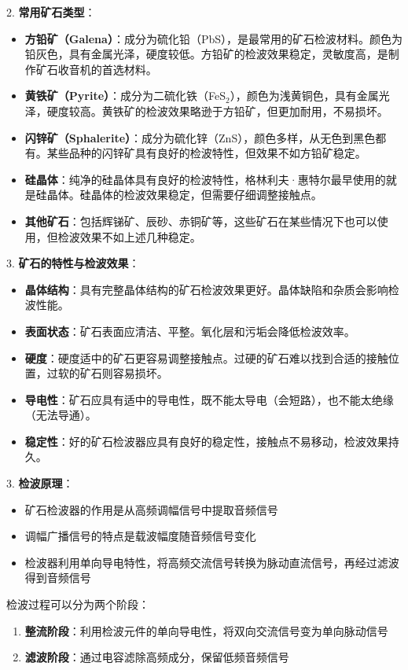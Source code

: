 \documentclass[12pt,UTF8]{ctexbook}
\begin{document}
2. \textbf{常用矿石类型}：
   \begin{itemize}[leftmargin=3.5em]
   \item \textbf{方铅矿（Galena）}：成分为硫化铅（PbS），是最常用的矿石检波材料。颜色为铅灰色，具有金属光泽，硬度较低。方铅矿的检波效果稳定，灵敏度高，是制作矿石收音机的首选材料。
   \item \textbf{黄铁矿（Pyrite）}：成分为二硫化铁（FeS$_2$），颜色为浅黄铜色，具有金属光泽，硬度较高。黄铁矿的检波效果略逊于方铅矿，但更加耐用，不易损坏。
   \item \textbf{闪锌矿（Sphalerite）}：成分为硫化锌（ZnS），颜色多样，从无色到黑色都有。某些品种的闪锌矿具有良好的检波特性，但效果不如方铅矿稳定。
   \item \textbf{硅晶体}：纯净的硅晶体具有良好的检波特性，格林利夫·惠特尔最早使用的就是硅晶体。硅晶体的检波效果稳定，但需要仔细调整接触点。
   \item \textbf{其他矿石}：包括辉锑矿、辰砂、赤铜矿等，这些矿石在某些情况下也可以使用，但检波效果不如上述几种稳定。
   \end{itemize}

3. \textbf{矿石的特性与检波效果}：
   \begin{itemize}[leftmargin=3.5em]
   \item \textbf{晶体结构}：具有完整晶体结构的矿石检波效果更好。晶体缺陷和杂质会影响检波性能。
   \item \textbf{表面状态}：矿石表面应清洁、平整。氧化层和污垢会降低检波效率。
   \item \textbf{硬度}：硬度适中的矿石更容易调整接触点。过硬的矿石难以找到合适的接触位置，过软的矿石则容易损坏。
   \item \textbf{导电性}：矿石应具有适中的导电性，既不能太导电（会短路），也不能太绝缘（无法导通）。
   \item \textbf{稳定性}：好的矿石检波器应具有良好的稳定性，接触点不易移动，检波效果持久。
   \end{itemize}

3. \textbf{检波原理}：
   \begin{itemize}[leftmargin=3.5em]
   \item 矿石检波器的作用是从高频调幅信号中提取音频信号
   \item 调幅广播信号的特点是载波幅度随音频信号变化
   \item 检波器利用单向导电特性，将高频交流信号转换为脉动直流信号，再经过滤波得到音频信号
   \end{itemize}

   检波过程可以分为两个阶段：
   \begin{enumerate}[leftmargin=3.5em]
       \item \textbf{整流阶段}：利用检波元件的单向导电性，将双向交流信号变为单向脉动信号
       \item \textbf{滤波阶段}：通过电容滤除高频成分，保留低频音频信号
   \end{enumerate}
\end{document}
